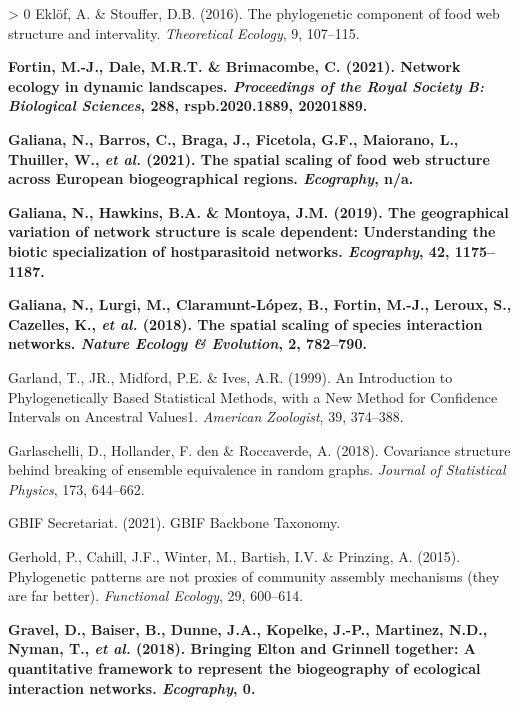 \documentclass[11pt]{article}
\makeatletter
\def\maxwidth{\ifdim\Gin@nat@width>\linewidth\linewidth
\else\Gin@nat@width\fi}
\let\Oldincludegraphics\includegraphics
\renewcommand{\includegraphics}[1]{\Oldincludegraphics[width=\maxwidth]{#1}}
\newlength{\cslhangindent}
\newenvironment{CSLReferences}[3] %
 {%
  \setlength{\parindent}{0pt}
  \ifodd #1 \everypar{\setlength{\hangindent}{\cslhangindent}}\ignorespaces\fi
  \ifnum #2 > 0
  \setlength{\parskip}{#2\baselineskip}
  \fi
 }%
 {}
\providecommand{\DIFaddtex}[1]{{\bf #1}} %
\providecommand{\DIFaddbegin}{\protect\color{blue}} %
\providecommand{\DIFaddend}{\protect\color{black}} %
\providecommand{\DIFadd}[1]{\texorpdfstring{\DIFaddtex{#1}}{#1}} %
\newcommand{\DIFaddincludegraphics}[2][]{{\color{blue}\fbox{\DIFOincludegraphics[#1]{#2}}}} %
\DeclareRobustCommand{\DIFaddbegin}{\DIFOaddbegin \let\includegraphics\DIFaddincludegraphics} %
\DeclareRobustCommand{\DIFaddend}{\DIFOaddend \let\includegraphics\DIFOincludegraphics} %
\makeatother
\begin{document}
\begin{CSLReferences}{1}{0}
\leavevmode\hypertarget{ref-Eklof2016PhyCom}{}%
Eklöf, A. \& Stouffer, D.B. (2016). The phylogenetic component of food
web structure and intervality. \emph{Theoretical Ecology}, 9, 107--115.

\leavevmode\DIFaddbegin \hypertarget{ref-Fortin2021NetEco}{}%
\DIFadd{Fortin, M.-J., Dale, M.R.T. \& Brimacombe, C. (2021). Network ecology in
dynamic landscapes. \emph{Proceedings of the Royal Society B: Biological
Sciences}, 288, rspb.2020.1889, 20201889.
}

\leavevmode\hypertarget{ref-Galiana2021SpaSca}{}%
\DIFadd{Galiana, N., Barros, C., Braga, J., Ficetola, G.F., Maiorano, L.,
Thuiller, W., \emph{et al.} (2021). The spatial scaling of food web
structure across European biogeographical regions. \emph{Ecography},
n/a.
}

\leavevmode\hypertarget{ref-Galiana2019GeoVar}{}%
\DIFadd{Galiana, N., Hawkins, B.A. \& Montoya, J.M. (2019). The geographical
variation of network structure is scale dependent: Understanding the
biotic specialization of hostparasitoid networks. \emph{Ecography}, 42,
1175--1187.
}

\leavevmode\hypertarget{ref-Galiana2018SpaSca}{}%
\DIFadd{Galiana, N., Lurgi, M., Claramunt-López, B., Fortin, M.-J., Leroux, S.,
Cazelles, K., \emph{et al.} (2018). The spatial scaling of species
interaction networks. \emph{Nature Ecology \& Evolution}, 2, 782--790.
}

\leavevmode\DIFaddend \hypertarget{ref-Garland1999IntPhy}{}%
Garland, T., JR., Midford, P.E. \& Ives, A.R. (1999). An Introduction to
Phylogenetically Based Statistical Methods, with a New Method for
Confidence Intervals on Ancestral Values1. \emph{American Zoologist},
39, 374--388.

\leavevmode\hypertarget{ref-Garlaschelli2018CovStr}{}%
Garlaschelli, D., Hollander, F. den \& Roccaverde, A. (2018). Covariance
structure behind breaking of ensemble equivalence in random graphs.
\emph{Journal of Statistical Physics}, 173, 644--662.

\leavevmode\hypertarget{ref-GBIFSecretariat2021GbiBac}{}%
GBIF Secretariat. (2021). GBIF Backbone Taxonomy.

\leavevmode\hypertarget{ref-Gerhold2015PhyPat}{}%
Gerhold, P., Cahill, J.F., Winter, M., Bartish, I.V. \& Prinzing, A.
(2015). Phylogenetic patterns are not proxies of community assembly
mechanisms (they are far better). \emph{Functional Ecology}, 29,
600--614.

\leavevmode\DIFaddbegin \hypertarget{ref-Gravel2018BriElt}{}%
\DIFadd{Gravel, D., Baiser, B., Dunne, J.A., Kopelke, J.-P., Martinez, N.D.,
Nyman, T., \emph{et al.} (2018). Bringing Elton and Grinnell together: A
quantitative framework to represent the biogeography of ecological
interaction networks. \emph{Ecography}, 0.
}


\end{CSLReferences}
\end{document}
